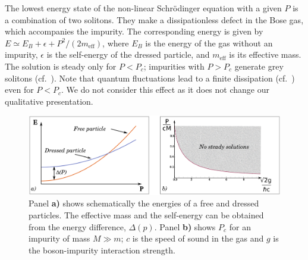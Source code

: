 \documentclass[twocolumn,amsmath,amssymb,showpacs,prl,superscriptaddress,aps]{revtex4-1}
\begin{document}
The lowest energy state of the non-linear Schr{\"o}dinger equation with a given $P$ is a combination of two solitons. 
They make a dissipationless defect in the Bose gas, which accompanies the impurity. The corresponding energy 
is given by $E\simeq E_B+\epsilon+P^2/(2m_{\mathrm{eff}})$, where $E_B$ is the energy of the gas without an impurity, 
$\epsilon$ is the self-energy of the dressed particle, and $m_{\mathrm{eff}}$ is its effective mass. The solution is steady only 
for $P<P_c$; impurities with $P>P_c$ generate grey solitons (cf.~\cite{hakim1997}). 
Note that quantum fluctuations lead to a finite dissipation (cf.~\cite{astrakharchik2004,sykes2009,Cherny2012})
even for $P<P_c$. We do not consider this effect as it does not change our qualitative presentation.


\begin{figure}
\centerline{\includegraphics[scale=0.3]{figure3.pdf}}
\caption{Panel {\bf a)} shows schematically the energies of a free and dressed particles. 
The effective mass and the self-energy 
can be obtained from the energy difference, $\Delta(p)$.
Panel {\bf b)} shows $P_c$ for an impurity of mass $M\gg m$; 
$c$ is the speed of sound in the gas and $g$ is the boson-impurity interaction strength.
  }
\label{fig:Figure3}
\end{figure}
\end{document}
